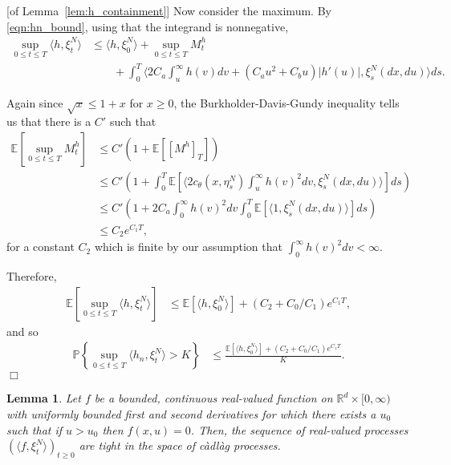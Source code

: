 \documentclass[12pt]{article}
\newenvironment {proof}{{\noindent\bf Proof }}{\hfill $\Box$ \medskip}
\newtheorem{lemma}[theorem]{Lemma}
\newcommand{\IP}{\mathbb P}
\newcommand{\IE}{\mathbb E}
\newcommand{\IR}{\mathbb R}
\newcommand{\lp}{\xi}              %
\numberwithin{equation}{section}
\begin{document}
\begin{proof}[of Lemma~\ref{lem:h_containment}]
    Now consider the maximum. By \eqref{eqn:hn_bound},
    using that the integrand is nonnegative,
    \begin{align*}
        \sup_{0 \le t \le T} \langle h, \lp_t^N \rangle
        &\le
        \langle h, \lp_0^N \rangle
        + \sup_{0 \le t \le T} M^{h}_t 
        \\ & \qquad {}
        + \int_0^T 
        \big \langle
            2 C_a \int_u^\infty h(v) dv
            + \left( C_a u^2 + C_b u \right) |h'(u)|
        ,
        \lp_s^N(dx, du) \big \rangle
        ds .
    \end{align*}

    Again since $\sqrt{x} \le 1 + x$ for $x \ge 0$,
    the Burkholder-Davis-Gundy inequality
    tells us that there is a $C'$ such that
    \begin{align*}
    \IE\left[ \sup_{0 \le t \le T} M^{h}_t \right]
    & \le
        C'\left( 1 + \IE\left[ [M^{h}]_T \right] \right)
    \\ & \le
        C' \left( 1 + \int_0^T \IE\left[
        \langle 2 c_\theta(x, \eta_s^N) \int_u^\infty h(v)^2 dv
        ,
        \lp_s^N(dx, du) \big \rangle
        \right] ds \right) 
    \\ & \le
        C' \left( 1 + 2 C_a \int_0^\infty h(v)^2 dv
        \int_0^T \IE\left[
            \langle 1 , \lp_s^N(dx, du) \big \rangle
        \right] ds \right)  
    \\ & \le
        C_2 e^{C_1 T} ,
    \end{align*}
    for a constant $C_2$ which is finite
    by our assumption that $\int_0^\infty h(v)^2 dv < \infty$.

    Therefore, 
    \begin{align*}
        \IE\left[ \sup_{0 \le t \le T} \langle h, \lp_t^N \rangle \right]
        &\le
        \IE\left[ \langle h, \lp_0^N \rangle \right]
        + (C_2 + C_0 / C_1) e^{C_1 T},
    \end{align*}
    and so
    \begin{align*}
        \IP\left\{ \sup_{0 \le t \le T} \langle h_n, \lp_t^N \rangle > K \right\}
        &\le
        \frac{
            \IE\left[ \langle h, \lp_0^N \rangle \right]
            + (C_2 + C_0 / C_1) e^{C_1 T}
        }{ K } .
    \end{align*}
\end{proof}

\begin{lemma}
    \label{lem:test_fn_tightness}
    Let $f$ be a bounded, continuous real-valued function on $\IR^d \times [0, \infty)$
    with uniformly bounded first and second derivatives
    for which there exists a $u_0$ such that if $u > u_0$ then $f(x, u) = 0$.
    Then, the sequence of real-valued processes $(\langle f, \lp_t^N \rangle)_{t \ge 0}$
    are tight in the space of c\`adl\`ag processes.
\end{lemma}
\end{document}
